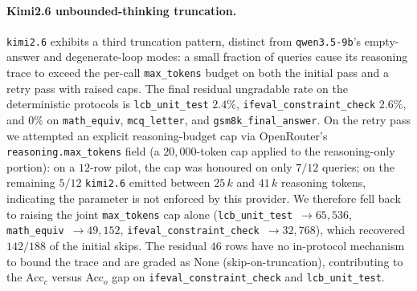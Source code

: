 \documentclass[11pt,a4paper]{article}
\begin{document}
\paragraph{Kimi2.6 unbounded-thinking truncation.} \texttt{kimi2.6} exhibits a
third truncation pattern, distinct from \texttt{qwen3.5-9b}'s empty-answer and
degenerate-loop modes: a small fraction of queries cause its reasoning trace to
exceed the per-call \texttt{max\_tokens} budget on both the initial pass and a
retry pass with raised caps. The final residual ungradable rate on the
deterministic protocols is \texttt{lcb\_unit\_test} $2.4\%$,
\texttt{ifeval\_constraint\_check} $2.6\%$, and $0\%$ on \texttt{math\_equiv},
\texttt{mcq\_letter}, and \texttt{gsm8k\_final\_answer}. On the retry pass we
attempted an explicit reasoning-budget cap via OpenRouter's
\texttt{reasoning.max\_tokens} field (a $20{,}000$-token cap applied to the
reasoning-only portion): on a $12$-row pilot, the cap was honoured on only
$7/12$ queries; on the remaining $5/12$ \texttt{kimi2.6} emitted between
$25\,k$ and $41\,k$ reasoning tokens, indicating the parameter is not enforced
by this provider. We therefore fell back to raising the joint
\texttt{max\_tokens} cap alone (\texttt{lcb\_unit\_test}~$\to 65{,}536$,
\texttt{math\_equiv}~$\to 49{,}152$,
\texttt{ifeval\_constraint\_check}~$\to 32{,}768$), which recovered $142/188$
of the initial skips. The residual $46$ rows have no in-protocol mechanism to
bound the trace and are graded as None (skip-on-truncation), contributing to
the Acc$_c$ versus Acc$_o$ gap on \texttt{ifeval\_constraint\_check} and
\texttt{lcb\_unit\_test}.
\end{document}
